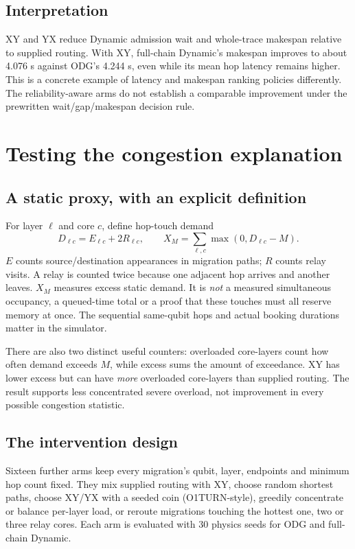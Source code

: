 \documentclass[11pt,a4paper,oneside]{report}
\begin{document}


\section{Interpretation}
XY and YX reduce Dynamic admission wait and whole-trace makespan relative to supplied routing. With XY, full-chain Dynamic's makespan improves to about 4.076 s against ODG's 4.244 s, even while its mean hop latency remains higher. This is a concrete example of latency and makespan ranking policies differently. The reliability-aware arms do not establish a comparable improvement under the prewritten wait/gap/makespan decision rule.

\chapter{Testing the congestion explanation}
\section{A static proxy, with an explicit definition}
For layer $\ell$ and core $c$, define hop-touch demand
\[
 D_{\ell c}=E_{\ell c}+2R_{\ell c},\qquad
 X_M=\sum_{\ell,c}\max(0,D_{\ell c}-M).
\]
$E$ counts source/destination appearances in migration paths; $R$ counts relay visits. A relay is counted twice because one adjacent hop arrives and another leaves. $X_M$ measures excess static demand. It is \emph{not} a measured simultaneous occupancy, a queued-time total or a proof that these touches must all reserve memory at once. The sequential same-qubit hops and actual booking durations matter in the simulator.

There are also two distinct useful counters: overloaded core-layers count how often demand exceeds $M$, while excess sums the amount of exceedance. XY has lower excess but can have \emph{more} overloaded core-layers than supplied routing. The result supports less concentrated severe overload, not improvement in every possible congestion statistic.

\section{The intervention design}
Sixteen further arms keep every migration's qubit, layer, endpoints and minimum hop count fixed. They mix supplied routing with XY, choose random shortest paths, choose XY/YX with a seeded coin (O1TURN-style), greedily concentrate or balance per-layer load, or reroute migrations touching the hottest one, two or three relay cores. Each arm is evaluated with 30 physics seeds for ODG and full-chain Dynamic.
\end{document}
